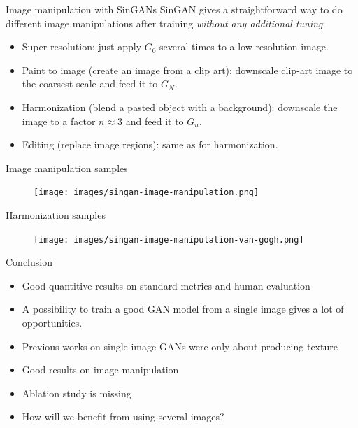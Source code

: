 \documentclass[handout, 10pt]{beamer}
\begin{document}
\begin{frame}{Image manipulation with SinGANs}
SinGAN gives a straightforward way to do different image manipulations after training \textit{without any additional tuning}:
    \begin{itemize}
        \item\pause Super-resolution: just apply $G_0$ several times to a low-resolution image.
        \item\pause Paint to image (create an image from a clip art): downscale clip-art image to the coarsest scale and feed it to $G_N$.
        \item\pause Harmonization (blend a pasted object with a background): downscale the image to a factor $n \approx 3$ and feed it to $G_n$.
        \item\pause Editing (replace image regions): same as for harmonization.
    \end{itemize}
\end{frame}

\begin{frame}{Image manipulation samples}
    \begin{figure}
        \centering
        \texttt{[image: images/singan-image-manipulation.png]}
    \end{figure}
\end{frame}

\begin{frame}{Harmonization samples}
    \begin{figure}
        \centering
        \texttt{[image: images/singan-image-manipulation-van-gogh.png]}
    \end{figure}
\end{frame}


\begin{frame}{Conclusion}
    \begin{itemize}
        \item Good quantitive results on standard metrics and human evaluation
        \item A possibility to train a good GAN model from a single image gives a lot of opportunities.
        \item Previous works on single-image GANs were only about producing texture
        \item Good results on image manipulation
        \item Ablation study is missing
        \item How will we benefit from using several images?
    \end{itemize}
\end{frame}
\end{document}
